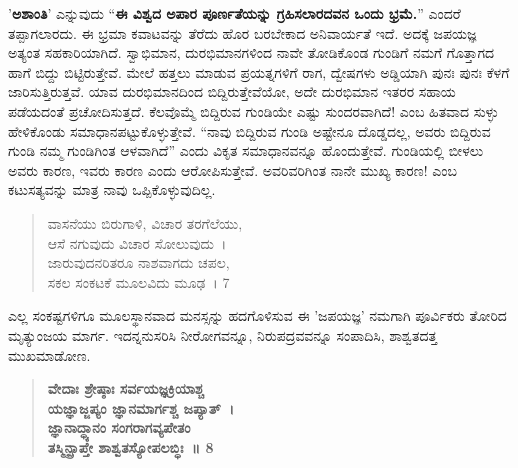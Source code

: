 {’\textbf{ಅಶಾಂತಿ}’ ಎನ್ನುವುದು “\textbf{ಈ ವಿಶ್ವದ ಅಪಾರ ಪೂರ್ಣತೆಯನ್ನು ಗ್ರಹಿಸಲಾರದವನ ಒಂದು ಭ್ರಮೆ.}” ಎಂದರೆ ತಪ್ಪಾಗಲಾರದು. ಈ ಭ್ರಮಾ ಕವಾಟವನ್ನು ತೆರೆದು ಹೊರ ಬರಬೇಕಾದ ಅನಿವಾರ್ಯತೆ ಇದೆ. ಅದಕ್ಕೆ ಜಪಯಜ್ಞ ಅತ್ಯಂತ ಸಹಕಾರಿಯಾಗಿದೆ. ಸ್ವಾಭಿಮಾನ, ದುರಭಿಮಾನಗಳಿಂದ ನಾವೇ ತೋಡಿಕೊಂಡ ಗುಂಡಿಗೆ ನಮಗೆ ಗೊತ್ತಾಗದ ಹಾಗೆ ಬಿದ್ದು ಬಿಟ್ಟಿರುತ್ತೇವೆ. ಮೇಲೆ ಹತ್ತಲು ಮಾಡುವ ಪ್ರಯತ್ನಗಳಿಗೆ ರಾಗ, ದ್ವೇಷಗಳು ಅಡ್ಡಿಯಾಗಿ ಪುನಃ ಪುನಃ ಕೆಳಗೆ ಜಾರಿಸುತ್ತಿರುತ್ತವೆ. ಯಾವ ದುರಭಿಮಾನದಿಂದ ಬಿದ್ದಿರುತ್ತೇವೆಯೋ, ಅದೇ ದುರಭಿಮಾನ ಇತರರ ಸಹಾಯ ಪಡೆಯದಂತೆ ಪ್ರಚೋದಿಸುತ್ತದೆ. ಕೆಲವೊಮ್ಮೆ ಬಿದ್ದಿರುವ ಗುಂಡಿಯೇ ಎಷ್ಟು ಸುಂದರವಾಗಿದೆ! ಎಂಬ ಹಿತವಾದ ಸುಳ್ಳು ಹೇಳಿಕೊಂಡು ಸಮಾಧಾನಪಟ್ಟುಕೊಳ್ಳುತ್ತೇವೆ. “ನಾವು ಬಿದ್ದಿರುವ ಗುಂಡಿ ಅಷ್ಟೇನೂ ದೊಡ್ಡದಲ್ಲ, ಅವರು ಬಿದ್ದಿರುವ ಗುಂಡಿ ನಮ್ಮ ಗುಂಡಿಗಿಂತ ಆಳವಾಗಿದೆ” ಎಂದು ವಿಕೃತ ಸಮಾಧಾನವನ್ನೂ ಹೊಂದುತ್ತೇವೆ. ಗುಂಡಿಯಲ್ಲಿ ಬೀಳಲು ಅವರು ಕಾರಣ, ಇವರು ಕಾರಣ ಎಂದು ಆರೋಪಿಸುತ್ತೇವೆ. ಅವರಿವರಿಗಿಂತ ನಾನೇ ಮುಖ್ಯ ಕಾರಣ! ಎಂಬ ಕಟುಸತ್ಯವನ್ನು ಮಾತ್ರ ನಾವು ಒಪ್ಪಿಕೊಳ್ಳುವುದಿಲ್ಲ.

\begin{verse}
ವಾಸನೆಯು ಬಿರುಗಾಳಿ, ವಿಚಾರ ತರಗೆಲೆಯು, \\ಆಸೆ ನಗುವುದು ವಿಚಾರ ಸೋಲುವುದು~। \\
ಜಾರುವುದನರಿತರೂ ನಾಶವಾಗದು ಚಪಲ, \\ಸಕಲ ಸಂಕಟಕೆ ಮೂಲವಿದು ಮೂಢ~। 7
\end{verse}
ಎಲ್ಲ ಸಂಕಷ್ಟಗಳಿಗೂ ಮೂಲಸ್ಥಾನವಾದ ಮನಸ್ಸನ್ನು ಹದಗೊಳಿಸುವ ಈ ’ಜಪಯಜ್ಞ’ ನಮಗಾಗಿ ಪೂರ್ವಿಕರು ತೋರಿದ ಮೃತ್ಯುಂಜಯ ಮಾರ್ಗ. ಇದನ್ನನುಸರಿಸಿ ನೀರೋಗವನ್ನೂ, ನಿರುಪದ್ರವವನ್ನೂ ಸಂಪಾದಿಸಿ, ಶಾಶ್ವತದತ್ತ ಮುಖಮಾಡೋಣ.
\begin{verse}	
\textbf{ವೇದಾಃ ಶ್ರೇಷ್ಠಾಃ ಸರ್ವಯಜ್ಞಕ್ರಿಯಾಶ್ಚ \\ಯಜ್ಞಾಜ್ಜಪ್ಯಂ ಜ್ಞಾನಮಾರ್ಗಶ್ಚ ಜಪ್ಯಾತ್~। \\
ಜ್ಞಾನಾದ್ಧ್ಯಾನಂ ಸಂಗರಾಗವ್ಯಪೇತಂ \\ತಸ್ಮಿನ್ಪ್ರಾಪ್ತೇ ಶಾಶ್ವತಸ್ಯೋಪಲಬ್ಧಿಃ~॥ 8}
\end{verse}	

\articleend
}
